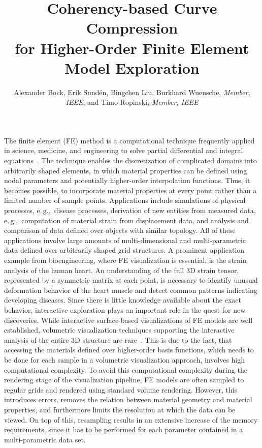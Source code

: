 \documentclass[review,journal]{vgtc}         %
\title{Coherency-based Curve Compression\\ for Higher-Order Finite Element Model Exploration}
\author{Alexander Bock, Erik Sund\'en, Bingchen Liu, Burkhard Wuensche, \textit{Member, IEEE}, and Timo Ropinski, \textit{Member, IEEE}}
\begin{document}

\label{sec:introduction}

\maketitle

The finite element (FE) method is a computational technique frequently applied in science, medicine, and engineering to solve partial differential and integral equations~\cite{Young00}. The technique enables the discretization of complicated domains into arbitrarily shaped elements, in which material properties can be defined using nodal parameters and potentially higher-order interpolation functions. Thus, it becomes possible, to incorporate material properties at every point rather than a limited number of sample points. Applications include simulations of physical processes, e.\,g.,~disease processes, derivation of new entities from measured data, e.\,g.,~computation of material strain from displacement data, and analysis and comparison of data defined over objects with similar topology. All of these applications involve large amounts of multi-dimensional and multi-parametric data defined over arbitrarily shaped grid structures. A prominent application example from bioengineering, where FE visualization is essential, is the strain analysis of the human heart. An understanding of the full 3D strain tensor, represented by a symmetric matrix at each point, is necessary to identify unusual deformation behavior of the heart muscle and detect common patterns indicating developing diseases. Since there is little knowledge available about the exact behavior, interactive exploration plays an important role in the quest for new discoveries. While interactive surface-based visualizations of FE models are well established, volumetric visualization techniques supporting the interactive analysis of the entire 3D structure are rare~\cite{Wihelms90}. This is due to the fact, that accessing the materials defined over higher-order basis functions, which needs to be done for each sample in a volumetric visualization approach, involves high computational complexity. To avoid this computational complexity during the rendering stage of the visualization pipeline, FE models are often sampled to regular grids and rendered using standard volume rendering. However, this introduces errors, removes the relation between material geometry and material properties, and furthermore limits the resolution at which the data can be viewed. On top of this, resampling results in an extensive increase of the memory requirements, since it has to be performed for each parameter contained in a multi-parametric data set.
\end{document}
